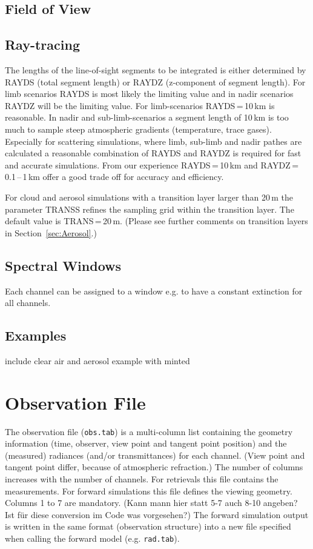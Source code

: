 \subsection{Field of View}
\todo

\subsection{Ray-tracing}
The lengths of the line-of-sight segments to be integrated is either determined by RAYDS (total segment length) or RAYDZ (z-component of segment length). For limb scenarios RAYDS is most likely the limiting value and in nadir scenarios RAYDZ will be the limiting value. For limb-scenarios RAYDS\,=\,10\,km is reasonable. In nadir and sub-limb-scenarios a segment length of 10\,km is too much to sample steep atmospheric gradients (temperature, trace gases). Especially for scattering simulations, where limb, sub-limb and nadir pathes are calculated a reasonable combination of RAYDS and RAYDZ is required for fast and accurate simulations. From our experience RAYDS\,=\,10\,km and RAYDZ\,=\,0.1\,--\,1\,km offer a good trade off for accuracy and efficiency. 

For cloud and aerosol simulations with a transition layer larger than 20\,m the parameter TRANSS refines the sampling grid within the transition layer. The default value is TRANS\,=\,20\,m. (Please see further comments on transition layers in Section~\ref{sec:Aerosol}.)

\subsection{Spectral Windows}
Each channel can be assigned to a window e.g. to have a constant extinction for all channels.

\subsection{Examples}
\label{sec:ControlExamples}
\todo include clear air and aerosol example with minted


\section{Observation File}
The observation file (\texttt{obs.tab}) is a multi-column list containing the geometry information (time, observer, view point and tangent point position) and the (measured) radiances (and/or transmittances) for each channel. (View point and tangent point differ, because of atmospheric refraction.) The number of columns increases with the number of channels. For retrievals this file contains the measurements. For forward simulations this file defines the viewing geometry. Columns 1 to 7 are mandatory. (Kann mann hier statt 5-7 auch 8-10 angeben? Ist für diese conversion im Code was vorgesehen?) The forward simulation output is written in the same format (observation structure) into a new file specified when calling the forward model (e.g. \texttt{rad.tab}).

